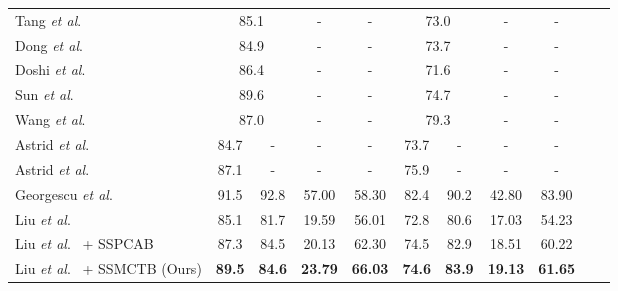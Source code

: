 \documentclass[10pt,journal,compsoc]{IEEEtran}
\newcommand{\etal}{\textit{et al}.}
\begin{document}
\begin{table*}[t]
\begin{tabular}{| l | c | c | c | c | c | c | c | c |  c | c |}
 \cline{6-7}
Tang \etal~\cite{Tang-PRL-2020} & \multicolumn{2}{c|}{85.1} & - & - & \multicolumn{2}{c|}{73.0} & - & -  \\
Dong \etal~\cite{Dong-Access-2020} & \multicolumn{2}{c|}{84.9} & - & - & \multicolumn{2}{c|}{73.7} & - & - \\
Doshi \etal~\cite{Doshi-CVPRW-2020a}  & \multicolumn{2}{c|}{86.4} & - & - & \multicolumn{2}{c|}{71.6} & - & - \\
Sun \etal~\cite{Sun-ACMMM-2020}  & \multicolumn{2}{c|}{89.6} & - & - & \multicolumn{2}{c|}{74.7} & - & -  \\
Wang \etal~\cite{Wang-ACMMM-2020} & \multicolumn{2}{c|}{87.0} & - & - & \multicolumn{2}{c|}{79.3} & - & -  \\
\cline{2-3}
 \cline{6-7}
Astrid \etal~\cite{Astrid-ICCVW-2021} & 84.7 & - & - & - & 73.7 & - & - & - \\
Astrid \etal~\cite{Astrid-BMVC-2021} & 87.1 & - & - & - & 75.9 & - & - & - \\
Georgescu \etal~\cite{Georgescu-CVPR-2021} &  91.5 & 92.8 & 57.00 & 58.30 & 82.4 & 90.2 & 42.80 & 83.90  \\

 \hline
Liu \etal~\cite{Liu-CVPR-2018} & 85.1 & 81.7 & 19.59 & 56.01 & 72.8 & 80.6 & 17.03 & 54.23 \\
Liu \etal~\cite{Liu-CVPR-2018} + SSPCAB \cite{Ristea-CVPR-2022} & 87.3 & 84.5 & 20.13 & 62.30 & 74.5 & 82.9 & 18.51 & 60.22 \\
Liu \etal~\cite{Liu-CVPR-2018} + SSMCTB (Ours) & \textbf{89.5} & \textbf{84.6} & \textbf{23.79} & \textbf{66.03} & \textbf{74.6} & \textbf{83.9} & \textbf{19.13} & \textbf{61.65} \\


\end{tabular}
\end{table*}
\end{document}

